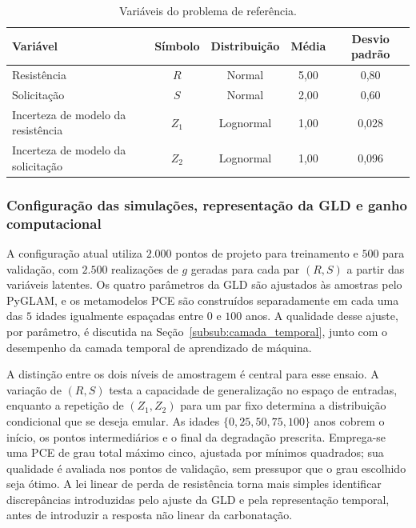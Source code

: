 \begin{table}[H]
\centering
\caption{Variáveis do problema de referência.}
\label{tab:random_variables_parameters}
\begin{tabular}{lcccc}
\toprule
Variável & Símbolo & Distribuição & Média & Desvio padrão \\
\midrule
Resistência & $R$ & Normal & 5,00 & 0,80 \\
Solicitação & $S$ & Normal & 2,00 & 0,60 \\
Incerteza de modelo da resistência & $Z_1$ & Lognormal & 1,00 & 0,028 \\
Incerteza de modelo da solicitação & $Z_2$ & Lognormal & 1,00 & 0,096 \\
\bottomrule
\end{tabular}
\end{table}

\subsubsection{Configuração das simulações, representação da GLD e ganho computacional}
\label{subsub:ex1_speedup}

A configuração atual utiliza $2.000$ pontos de projeto para treinamento e $500$ para validação, com $2.500$ realizações de $g$ geradas para cada par $(R,S)$ a partir das variáveis latentes. Os quatro parâmetros da GLD são ajustados às amostras pelo PyGLAM, e os metamodelos PCE são construídos separadamente em cada uma das $5$ idades igualmente espaçadas entre $0$ e $100$ anos. A qualidade desse ajuste, por parâmetro, é discutida na Seção~\ref{subsub:camada_temporal}, junto com o desempenho da camada temporal de aprendizado de máquina.

A distinção entre os dois níveis de amostragem é central para esse ensaio. A variação de $(R,S)$ testa a capacidade de generalização no espaço de entradas, enquanto a repetição de $(Z_1,Z_2)$ para um par fixo determina a distribuição condicional que se deseja emular. As idades $\{0,25,50,75,100\}$ anos cobrem o início, os pontos intermediários e o final da degradação prescrita. Emprega-se uma PCE de grau total máximo cinco, ajustada por mínimos quadrados; sua qualidade é avaliada nos pontos de validação, sem pressupor que o grau escolhido seja ótimo. A lei linear de perda de resistência torna mais simples identificar discrepâncias introduzidas pelo ajuste da GLD e pela representação temporal, antes de introduzir a resposta não linear da carbonatação.

